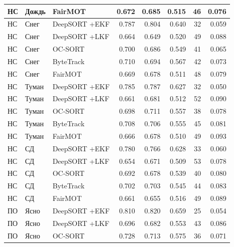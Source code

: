\begin{longtable}{|p{2.42cm}|p{1.8cm}|p{2.4cm}|r|r|r|r|r|}
       НС     &      Дождь &      FairMOT & 0.672 & 0.685 & 0.515 &   46 & 0.076       \\ \hline
       НС     &      Снег & DeepSORT +EKF & 0.787 & 0.804 & 0.640 &   32 & 0.059       \\ \hline
       НС     &      Снег & DeepSORT +LKF & 0.664 & 0.649 & 0.520 &   49 & 0.088       \\ \hline
       НС     &      Снег &      OC-SORT & 0.700 & 0.686 & 0.549 &   41 & 0.065        \\ \hline
       НС     &      Снег &    ByteTrack & 0.710 & 0.694 & 0.567 &   42 & 0.073        \\ \hline
       НС     &      Снег &      FairMOT & 0.669 & 0.678 & 0.511 &   48 & 0.079        \\ \hline
       НС     &      Туман & DeepSORT +EKF & 0.785 & 0.787 & 0.627 &   32 & 0.050     \\ \hline
       НС     &      Туман & DeepSORT +LKF & 0.661 & 0.681 & 0.512 &   52 & 0.090     \\ \hline
       НС     &      Туман &      OC-SORT & 0.698 & 0.711 & 0.557 &   38 & 0.078      \\ \hline
       НС     &      Туман &    ByteTrack & 0.708 & 0.706 & 0.555 &   45 & 0.081      \\ \hline
       НС     &      Туман &      FairMOT & 0.666 & 0.678 & 0.510 &   49 & 0.093      \\ \hline
       НС     &      СД & DeepSORT +EKF & 0.780 & 0.766 & 0.628 &   33 & 0.060               \\ \hline
       НС     &      СД & DeepSORT +LKF & 0.654 & 0.671 & 0.509 &   53 & 0.078               \\ \hline
       НС     &      СД &      OC-SORT & 0.692 & 0.678 & 0.539 &   40 & 0.080                \\ \hline
       НС     &      СД &    ByteTrack & 0.702 & 0.703 & 0.545 &   44 & 0.083                \\ \hline
       НС     &      СД &      FairMOT & 0.661 & 0.655 & 0.516 &   49 & 0.089                \\ \hline
       ПО     &      Ясно & DeepSORT +EKF & 0.810 & 0.820 & 0.659 &   25 & 0.054                       \\ \hline
       ПО     &      Ясно & DeepSORT +LKF & 0.696 & 0.682 & 0.553 &   43 & 0.086                       \\ \hline
       ПО     &      Ясно &      OC-SORT & 0.728 & 0.713 & 0.575 &   36 & 0.071                        \\ \hline

\end{longtable}
